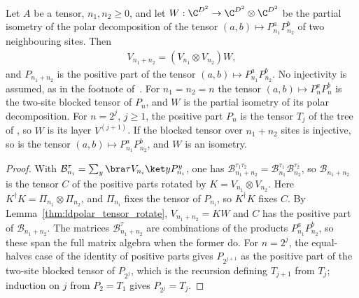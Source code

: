 \begin{lemma}
    \label{lem:ldp_polar_merge}
    \leanok
    Let $A$ be a tensor, $n_1,n_2\ge0$, and let
    $W:\C^{D^2}\to\C^{D^2}\otimes\C^{D^2}$ be the partial isometry of the polar
    decomposition of the tensor $(a,b)\mapsto P_{n_1}^aP_{n_2}^b$ of two
    neighbouring sites. Then
    \begin{align}
        V_{n_1+n_2}=(V_{n_1}\otimes V_{n_2})W,
        \label{eq:ldp_polar_merge}
    \end{align}
    and $P_{n_1+n_2}$ is the positive part of the tensor
    $(a,b)\mapsto P_{n_1}^aP_{n_2}^b$. No injectivity is assumed, as in the
    footnote of~\cite[paragraph ``The sequential-RG circuit'']{Malz2024Preparation}.
    For $n_1=n_2=n$ the tensor $(a,b)\mapsto P_n^aP_n^b$ is the two-site blocked
    tensor of $P_n$, and $W$ is the partial isometry of its polar decomposition.
    For $n=2^j$, $j\ge1$, the positive part $P_n$ is the tensor $T_j$ of the
    tree of \cite[eq.~(16)]{Malz2024Preparation}, so $W$ is its layer
    $V^{(j+1)}$. If the blocked tensor over $n_1+n_2$
    sites is injective, so is the tensor $(a,b)\mapsto P_{n_1}^aP_{n_2}^b$, and
    $W$ is an isometry.
\end{lemma}
\begin{proof}
    \leanok
    With $\mathcal B_{n_i}^{\tau}=\sum_y\bra\tau V_{n_i}\ket yP_{n_i}^y$, one has
    $\mathcal B_{n_1+n_2}^{\tau_1\tau_2}
        =\mathcal B_{n_1}^{\tau_1}\mathcal B_{n_2}^{\tau_2}$, so
    $\mathcal B_{n_1+n_2}$ is the tensor $C$ of the positive parts rotated by
    $K=V_{n_1}\otimes V_{n_2}$. Here
    $K^\dagger K=\Pi_{n_1}\otimes\Pi_{n_2}$, and $\Pi_{n_i}$ fixes the tensor of
    $P_{n_i}$, so $K^\dagger K$ fixes $C$. By
    Lemma~\ref{thm:ldpolar_tensor_rotate}, $V_{n_1+n_2}=KW$ and $C$ has the
    positive part of $\mathcal B_{n_1+n_2}$. The matrices
    $\mathcal B_{n_1+n_2}^{\tau}$ are combinations of the products
    $P_{n_1}^aP_{n_2}^b$, so these span the full matrix algebra when the former
    do. For $n=2^j$, the equal-halves case of the identity of positive parts
    gives $P_{2^{j+1}}$ as the positive part of the two-site blocked tensor of
    $P_{2^j}$, which is the recursion defining $T_{j+1}$ from $T_j$; induction
    on $j$ from $P_2=T_1$ gives $P_{2^j}=T_j$.
\end{proof}

